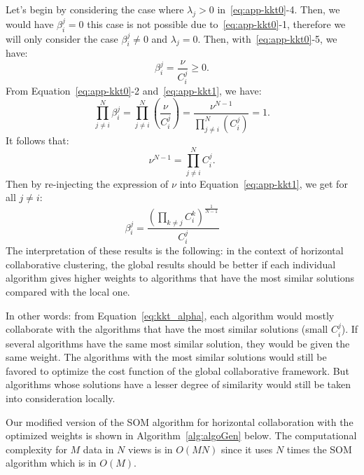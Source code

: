 Let's begin by considering the case where $\lambda_j > 0$ in~\eqref{eq:app-kkt0}-4. Then, we would have $\beta^j_i=0$  this case is not possible due to~\eqref{eq:app-kkt0}-1, therefore we will only consider the case $\beta^j_i \neq 0$ and $\lambda_j=0$. Then, with~\eqref{eq:app-kkt0}-5, we have:
\begin{equation}
    \beta^j_i  =   \frac{\nu} { C^j_i } \geq 0.
    \label{eq:app-kkt1}
\end{equation}
From Equation~\eqref{eq:app-kkt0}-2 and~\eqref{eq:app-kkt1}, we have:
\begin{equation}
    \prod_{j \neq i}^N   \beta^j_i  = \prod_{j \neq i}^N  \left(\frac{\nu}{C^j_i } \right)=\frac{\nu^{N-1}} { \prod_{j \neq i}^N  \left( {C^j_i } \right)}  =1.
\end{equation}
It follows that:
$$
\nu^{N-1}  =     \prod_{j \neq i}^N   C^j_i . 
$$
Then by re-injecting the expression of $\nu$ into Equation~\eqref{eq:app-kkt1}, we get for  all  $ j \neq i$:
\begin{equation}
\beta^j_i =  \frac{{(\prod_{k\neq j} C^k_i)}^{\frac 1 {N-1}}} {C^j_i} \qquad
\label{eq:kkt_alpha}
\end{equation} 
The interpretation of these results is the following: 
in the context of horizontal collaborative clustering, the global results should be better if each individual algorithm gives higher weights to algorithms that have the most similar solutions compared with the local one.

In other words: from Equation~\eqref{eq:kkt_alpha}, each algorithm would mostly collaborate with the algorithms that have the most similar solutions (small $C^j_i$). If several algorithms have the same most similar solution, they would be given the same weight.  The algorithms with the most similar solutions would still be favored to optimize the cost function of the global collaborative framework. But algorithms whose solutions have a lesser degree of similarity would still be taken into consideration locally. 


\medskip
Our modified version of the SOM algorithm for horizontal collaboration with the optimized weights is shown in Algorithm~\ref{alg:algoGen} below. The computational complexity for $M$ data in $N$ views is in $O(MN)$ since it uses $N$ times the SOM algorithm which is in $O(M)$.

